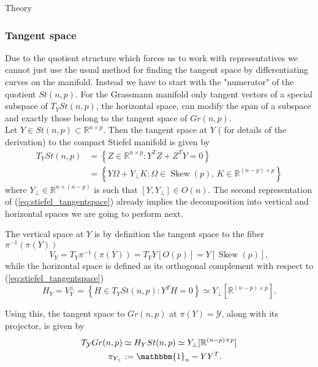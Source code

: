 \begin{chapter}{Theory}

\subsubsection{Tangent space} %
\label{ssub:Tangent space}
Due to the quotient structure which forces us to work with representatives we cannot just use the usual method for finding the tangent space by differentiating
curves on the manifold. Instead we have to start with the "numerator" of the quotient $St(n,p)$. For the Grassmann manifold only tangent vectors of a special subspace of $T_YSt(n,p)$,
the horizontal space, can modify the span of a subspace and exactly those belong to the tangent space of $Gr(n,p)$. \\

Let $Y\in St(n,p)\subset\mathbb{R}^{n\times p}$. Then the tangent space at $Y$ (\cite{Absil2009} for details of the derivation) to the compact Stiefel manifold is given by
\begin{align}
    \label{eq:stiefel_tangentspace}
   T_YSt(n,p)	&= \left\lbrace Z\in\mathbb{R}^{n\times p}: Y^TZ+Z^TY=0 \right\rbrace\\
   &=  \left\lbrace Y\Omega + Y_{\bot}K: \Omega\in\operatorname{Skew}(p),\, K\in\mathbb{R}^{(n-p)\times p} \right\rbrace\nonumber
\end{align}
where $Y_{\bot}\in\mathbb{R}^{n\times (n-p)}$ is such that $[Y,Y_{\bot}]\in O(n)$. The second representation of (\ref{eq:stiefel_tangentspace})
already implies the decomposition into vertical and horizontal spaces we are going to perform next.

The vertical space at $Y$ is by definition the tangent space to the fiber $\pi^{-1}(\pi(Y))$
\begin{equation}
    \label{eq:stiefel_horizontalspace}
    V_Y = T_Y\pi^{-1}(\pi(Y))=T_YY[O(p)]=Y[\operatorname{Skew}(p)],
\end{equation}
while the horizontal space is defined as its orthogonal complement with respect to (\ref{eq:stiefel_tangentspace})
\begin{equation}
    \label{eq:stiefel_verticalspace}
    H_Y=V_Y^{\bot} =\left\lbrace H\in T_Y St(n,p):Y^TH=0 \right\rbrace \simeq Y_{\bot}[\mathbb{R}^{(n-p)\times p}].
\end{equation}

Using this, the tangent space to $Gr(n,p)$ at $\pi(Y)=\mathcal{Y}$, along with its projector, is given by 
\begin{align}
    \label{eq:grassmann_tangentspace}
    T_{\mathcal{Y}}Gr(n,p)&\simeq  H_YSt(n,p)\simeq Y_{\bot}[\mathbb{R}^{(n-p)\times p}]\\
    \pi_{Y_{\bot}}&:=\mathbbm{1}_n-YY^T.
\end{align}


\end{chapter}
